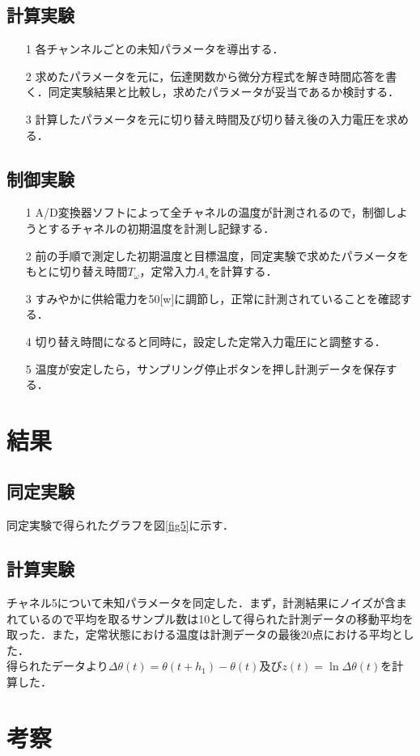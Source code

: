 \documentclass[11pt,a4paper]{jsarticle}
\begin{document}
  \subsection{計算実験}
\begin{itemize}
 \item[1] 各チャンネルごとの未知パラメータを導出する． 
 \item[2] 求めたパラメータを元に，伝達関数から微分方程式を解き時間応答を書く．同定実験結果と比較し，求めたパラメータが妥当であるか検討する．
 \item[3] 計算したパラメータを元に切り替え時間及び切り替え後の入力電圧を求める．
\end{itemize}

\subsection{制御実験}
\begin{itemize}
 \item[1] A/D変換器ソフトによって全チャネルの温度が計測されるので，制御しようとするチャネルの初期温度を計測し記録する．
 \item[2] 前の手順で測定した初期温度と目標温度，同定実験で求めたパラメータをもとに切り替え時間$T_\omega$，定常入力$A_s$を計算する．
 \item[3] すみやかに供給電力を50[w]に調節し，正常に計測されていることを確認する．
 \item[4] 切り替え時間になると同時に，設定した定常入力電圧にと調整する．
 \item[5] 温度が安定したら，サンプリング停止ボタンを押し計測データを保存する．
\end{itemize}

\section{結果}
  \subsection{同定実験}
  同定実験で得られたグラフを図\ref{fig5}に示す．

  \subsection{計算実験}
  チャネル5について未知パラメータを同定した．まず，計測結果にノイズが含まれているので平均を取るサンプル数は10として得られた計測データの移動平均を取った．また，定常状態における温度は計測データの最後20点における平均とした． \\
得られたデータより$\Delta \theta(t) = \theta(t + h_1) - \theta(t)$及び$z(t) = \ln \Delta \theta(t)$を計算した．



\section{考察}
\end{document}
